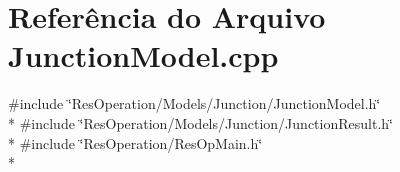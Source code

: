 \section{Referência do Arquivo Junction\+Model.\+cpp}
\label{_junction_model_8cpp}
{\ttfamily \#include \char`\"{}Res\+Operation/\+Models/\+Junction/\+Junction\+Model.\+h\char`\"{}}\\*
{\ttfamily \#include \char`\"{}Res\+Operation/\+Models/\+Junction/\+Junction\+Result.\+h\char`\"{}}\\*
{\ttfamily \#include \char`\"{}Res\+Operation/\+Res\+Op\+Main.\+h\char`\"{}}\\*
